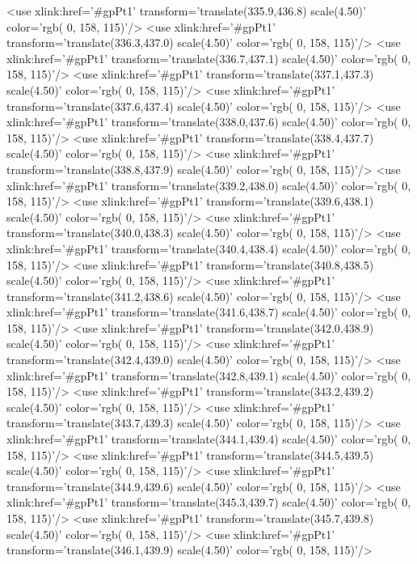 	<use xlink:href='#gpPt1' transform='translate(335.9,436.8) scale(4.50)' color='rgb(  0, 158, 115)'/>
	<use xlink:href='#gpPt1' transform='translate(336.3,437.0) scale(4.50)' color='rgb(  0, 158, 115)'/>
	<use xlink:href='#gpPt1' transform='translate(336.7,437.1) scale(4.50)' color='rgb(  0, 158, 115)'/>
	<use xlink:href='#gpPt1' transform='translate(337.1,437.3) scale(4.50)' color='rgb(  0, 158, 115)'/>
	<use xlink:href='#gpPt1' transform='translate(337.6,437.4) scale(4.50)' color='rgb(  0, 158, 115)'/>
	<use xlink:href='#gpPt1' transform='translate(338.0,437.6) scale(4.50)' color='rgb(  0, 158, 115)'/>
	<use xlink:href='#gpPt1' transform='translate(338.4,437.7) scale(4.50)' color='rgb(  0, 158, 115)'/>
	<use xlink:href='#gpPt1' transform='translate(338.8,437.9) scale(4.50)' color='rgb(  0, 158, 115)'/>
	<use xlink:href='#gpPt1' transform='translate(339.2,438.0) scale(4.50)' color='rgb(  0, 158, 115)'/>
	<use xlink:href='#gpPt1' transform='translate(339.6,438.1) scale(4.50)' color='rgb(  0, 158, 115)'/>
	<use xlink:href='#gpPt1' transform='translate(340.0,438.3) scale(4.50)' color='rgb(  0, 158, 115)'/>
	<use xlink:href='#gpPt1' transform='translate(340.4,438.4) scale(4.50)' color='rgb(  0, 158, 115)'/>
	<use xlink:href='#gpPt1' transform='translate(340.8,438.5) scale(4.50)' color='rgb(  0, 158, 115)'/>
	<use xlink:href='#gpPt1' transform='translate(341.2,438.6) scale(4.50)' color='rgb(  0, 158, 115)'/>
	<use xlink:href='#gpPt1' transform='translate(341.6,438.7) scale(4.50)' color='rgb(  0, 158, 115)'/>
	<use xlink:href='#gpPt1' transform='translate(342.0,438.9) scale(4.50)' color='rgb(  0, 158, 115)'/>
	<use xlink:href='#gpPt1' transform='translate(342.4,439.0) scale(4.50)' color='rgb(  0, 158, 115)'/>
	<use xlink:href='#gpPt1' transform='translate(342.8,439.1) scale(4.50)' color='rgb(  0, 158, 115)'/>
	<use xlink:href='#gpPt1' transform='translate(343.2,439.2) scale(4.50)' color='rgb(  0, 158, 115)'/>
	<use xlink:href='#gpPt1' transform='translate(343.7,439.3) scale(4.50)' color='rgb(  0, 158, 115)'/>
	<use xlink:href='#gpPt1' transform='translate(344.1,439.4) scale(4.50)' color='rgb(  0, 158, 115)'/>
	<use xlink:href='#gpPt1' transform='translate(344.5,439.5) scale(4.50)' color='rgb(  0, 158, 115)'/>
	<use xlink:href='#gpPt1' transform='translate(344.9,439.6) scale(4.50)' color='rgb(  0, 158, 115)'/>
	<use xlink:href='#gpPt1' transform='translate(345.3,439.7) scale(4.50)' color='rgb(  0, 158, 115)'/>
	<use xlink:href='#gpPt1' transform='translate(345.7,439.8) scale(4.50)' color='rgb(  0, 158, 115)'/>
	<use xlink:href='#gpPt1' transform='translate(346.1,439.9) scale(4.50)' color='rgb(  0, 158, 115)'/>
